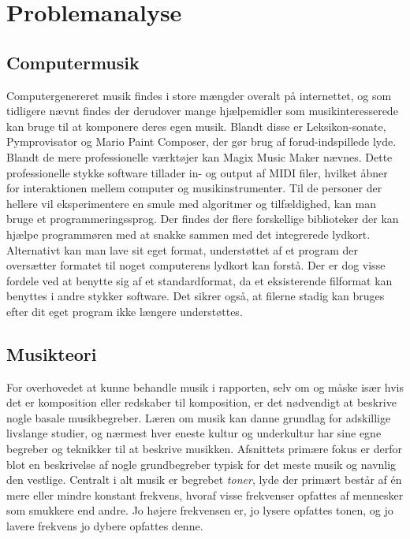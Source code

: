 \chapter{Problemanalyse}

\section {Computermusik}
Computergenereret musik findes i store mængder overalt på internettet, og som tidligere nævnt findes der derudover mange hjælpemidler som musikinteresserede kan bruge til at komponere deres egen musik. Blandt disse er  Leksikon-sonate, Pymprovisator og  Mario Paint Composer, der gør brug af forud-indspillede lyde. Blandt de mere professionelle værktøjer kan  Magix Music Maker nævnes. Dette professionelle stykke software tillader in- og output af MIDI filer, hvilket åbner for interaktionen mellem computer og musikinstrumenter. 
Til de personer der hellere vil eksperimentere en smule med algoritmer og tilfældighed, kan man bruge et programmeringssprog. Der findes der flere forskellige biblioteker der kan hjælpe programmøren med at snakke sammen med det integrerede lydkort. 
Alternativt kan man lave sit eget format, understøttet af et  program der oversætter formatet til noget computerens lydkort kan forstå. Der er dog visse fordele ved at benytte sig af et standardformat, da et eksisterende filformat kan benyttes i andre stykker software. Det sikrer også, at filerne stadig kan bruges efter dit eget program ikke længere understøttes.
\section {Musikteori}
For overhovedet at kunne behandle musik i rapporten, selv om og måske især hvis det er komposition eller redskaber til komposition, er det nødvendigt at beskrive nogle basale musikbegreber. Læren om musik kan danne grundlag for adskillige livslange studier, og nærmest hver eneste kultur og underkultur har sine egne begreber og teknikker til at beskrive musikken. 
Afsnittets primære fokus er derfor blot en beskrivelse af nogle grundbegreber typisk for det meste musik og navnlig den vestlige. 
Centralt i alt musik er begrebet  \textit{toner}, lyde der primært består af én mere eller mindre konstant frekvens, hvoraf visse frekvenser opfattes af mennesker som smukkere end andre.
Jo højere frekvensen er, jo lysere opfattes tonen, og jo lavere frekvens jo dybere opfattes denne. \cite{msparkMusic}
